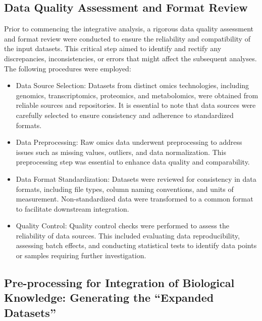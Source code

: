 \documentclass[a4paper, nobind]{templates/ociamthesis}
\begin{document}
\hypertarget{data-quality-assessment-and-format-review}{%
\subsection{Data Quality Assessment and Format Review}\label{data-quality-assessment-and-format-review}}

Prior to commencing the integrative analysis, a rigorous data quality assessment and format review were conducted to ensure the reliability and compatibility of the input datasets. This critical step aimed to identify and rectify any discrepancies, inconsistencies, or errors that might affect the subsequent analyses. The following procedures were employed:

\begin{itemize}
\item
  Data Source Selection: Datasets from distinct omics technologies, including genomics, transcriptomics, proteomics, and metabolomics, were obtained from reliable sources and repositories. It is essential to note that data sources were carefully selected to ensure consistency and adherence to standardized formats.
\item
  Data Preprocessing: Raw omics data underwent preprocessing to address issues such as missing values, outliers, and data normalization. This preprocessing step was essential to enhance data quality and comparability.
\item
  Data Format Standardization: Datasets were reviewed for consistency in data formats, including file types, column naming conventions, and units of measurement. Non-standardized data were transformed to a common format to facilitate downstream integration.
\item
  Quality Control: Quality control checks were performed to assess the reliability of data sources. This included evaluating data reproducibility, assessing batch effects, and conducting statistical tests to identify data points or samples requiring further investigation.
\end{itemize}

\hypertarget{pre-processing-for-integration-of-biological-knowledge-generating-the-expanded-datasets}{%
\subsection{Pre-processing for Integration of Biological Knowledge: Generating the ``Expanded Datasets''}\label{pre-processing-for-integration-of-biological-knowledge-generating-the-expanded-datasets}}
\end{document}
